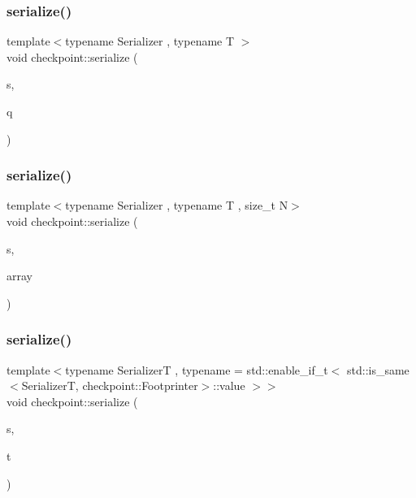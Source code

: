 \subsubsection{\texorpdfstring{serialize()}{serialize()}\hspace{0.1cm}{\footnotesize\ttfamily [3/30]}}
{\footnotesize\ttfamily template$<$typename Serializer , typename T $>$ \\
void checkpoint\+::serialize (\begin{DoxyParamCaption}\item[{Serializer \&}]{s,  }\item[{const std\+::queue$<$ T $>$ \&}]{q }\end{DoxyParamCaption})}

\mbox{\label{namespacecheckpoint_a976e83bf5f22b7bfc5036fd829be039e}} 
\subsubsection{\texorpdfstring{serialize()}{serialize()}\hspace{0.1cm}{\footnotesize\ttfamily [4/30]}}
{\footnotesize\ttfamily template$<$typename Serializer , typename T , size\+\_\+t N$>$ \\
void checkpoint\+::serialize (\begin{DoxyParamCaption}\item[{Serializer \&}]{s,  }\item[{std\+::array$<$ T, N $>$ \&}]{array }\end{DoxyParamCaption})}

\mbox{\label{namespacecheckpoint_ab9c05efe18a47d990fb20e84f73e9943}} 
\subsubsection{\texorpdfstring{serialize()}{serialize()}\hspace{0.1cm}{\footnotesize\ttfamily [5/30]}}
{\footnotesize\ttfamily template$<$typename SerializerT , typename  = std\+::enable\+\_\+if\+\_\+t$<$    std\+::is\+\_\+same$<$\+Serializer\+T, checkpoint\+::\+Footprinter$>$\+::value  $>$$>$ \\
void checkpoint\+::serialize (\begin{DoxyParamCaption}\item[{SerializerT \&}]{s,  }\item[{const std\+::thread \&}]{t }\end{DoxyParamCaption})}


